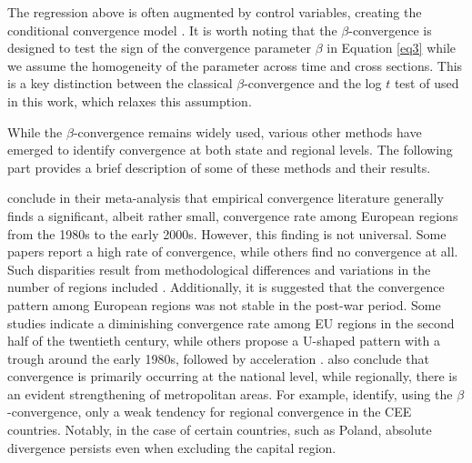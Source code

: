 \documentclass[11pt]{article}
\begin{document}
The regression above is often augmented by control variables, creating the conditional convergence model \citep{sala1996regional}. It is worth noting that the $\beta$-convergence is designed to test the sign of the convergence parameter $\beta$ in Equation \ref{eq3} while we assume the homogeneity of the parameter across time and cross sections. This is a key distinction 
between the classical  $\beta$-convergence and the log $t$ test of \citet{phillips2007transition} used in this work, which relaxes this assumption.

While the $\beta$-convergence remains widely used, various other methods have emerged to identify convergence at both state and regional levels. The following part provides a brief description of some of these methods and their results.
  
\citet{eckey2007convergence} conclude in their meta-analysis that empirical convergence literature generally finds a significant, albeit rather small, convergence rate among European regions from the 1980s to the early 2000s. However, this finding is not universal. Some papers report a high rate of convergence, while others find no convergence at all. Such disparities result from methodological differences and variations in the number of regions included \citep{eckey2007convergence}. Additionally, it is suggested that the convergence pattern among European regions was not stable in the post-war period. Some studies indicate a diminishing convergence rate among EU regions in the second half of the twentieth century, while others propose a U-shaped pattern with a trough around the early 1980s, followed by acceleration \citep{basile2001regional, geppert2008regional}. \citet{geppert2008regional} also conclude that convergence is primarily occurring at the national level, while regionally, there is an evident strengthening of metropolitan areas. For example, \citet*{sme2012regional} identify, using the $\beta$-convergence, only a weak tendency for regional convergence in the CEE countries. Notably, in the case of certain countries, such as Poland, absolute divergence persists even when excluding the capital region.
 
\end{document}
